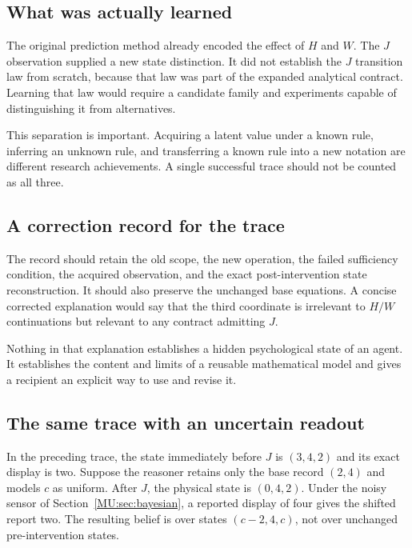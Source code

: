 \documentclass[11pt,oneside,openany]{book}
\numberwithin{equation}{section}
\begin{document}
\subsection{What was actually learned}
The original prediction method already encoded the effect of $H$ and $W$. The $J$ observation supplied a new state distinction. It did not establish the $J$ transition law from scratch, because that law was part of the expanded analytical contract. Learning that law would require a candidate family and experiments capable of distinguishing it from alternatives.

This separation is important. Acquiring a latent value under a known rule, inferring an unknown rule, and transferring a known rule into a new notation are different research achievements. A single successful trace should not be counted as all three.

\subsection{A correction record for the trace}
The record should retain the old scope, the new operation, the failed sufficiency condition, the acquired observation, and the exact post-intervention state reconstruction. It should also preserve the unchanged base equations. A concise corrected explanation would say that the third coordinate is irrelevant to $H/W$ continuations but relevant to any contract admitting $J$.

Nothing in that explanation establishes a hidden psychological state of an agent. It establishes the content and limits of a reusable mathematical model and gives a recipient an explicit way to use and revise it.

\subsection{The same trace with an uncertain readout}
In the preceding trace, the state immediately before $J$ is $(3,4,2)$ and its exact display is two. Suppose the reasoner retains only the base record $(2,4)$ and models $c$ as uniform. After $J$, the physical state is $(0,4,2)$. Under the noisy sensor of Section~\ref{MU:sec:bayesian}, a reported display of four gives the shifted report two. The resulting belief is over states $(c-2,4,c)$, not over unchanged pre-intervention states.
\end{document}
